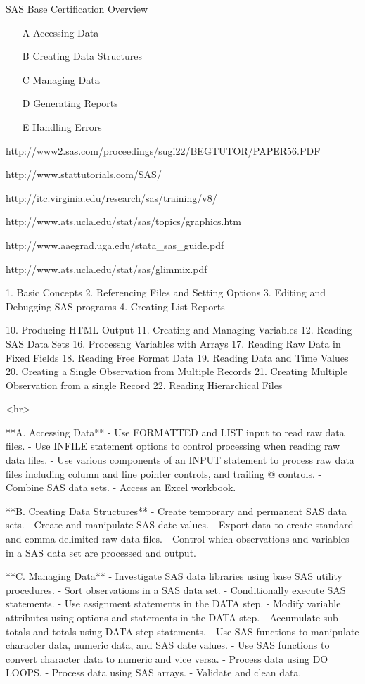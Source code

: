 
SAS Base Certification Overview

\begin{itemize}
\item[A] Accessing Data
\item[B] Creating Data Structures
\item[C] Managing Data
\item[D] Generating Reports
\item[E] Handling Errors
\end{itemize}

http://www2.sas.com/proceedings/sugi22/BEGTUTOR/PAPER56.PDF

http://www.stattutorials.com/SAS/

http://itc.virginia.edu/research/sas/training/v8/

http://www.ats.ucla.edu/stat/sas/topics/graphics.htm

http://www.aaegrad.uga.edu/stata_sas_guide.pdf

http://www.ats.ucla.edu/stat/sas/glimmix.pdf



1. Basic Concepts
2. Referencing Files and Setting Options
3. Editing and Debugging SAS programs
4. Creating List Reports

10. Producing HTML Output
11. Creating and Managing Variables
12. Reading SAS Data Sets
16. Processng Variables with Arrays
17. Reading Raw Data in Fixed Fields
18. Reading Free Format Data
19. Reading Data and Time Values
20. Creating a Single Observation from Multiple Records
21. Creating Multiple Observation from a single Record
22. Reading Hierarchical Files

<hr>

**A. Accessing Data**
- Use FORMATTED and LIST input to read raw data files.
- Use INFILE statement options to control processing when reading raw data files.
- Use various components of an INPUT statement to process raw data files including column and line pointer controls, and trailing @ controls.
- Combine SAS data sets.
- Access an Excel workbook.

**B. Creating Data Structures**
- Create temporary and permanent SAS data sets.
- Create and manipulate SAS date values.
- Export data to create standard and comma-delimited raw data files.
- Control which observations and variables in a SAS data set are processed and output.

**C. Managing Data**
- Investigate SAS data libraries using base SAS utility procedures.
- Sort observations in a SAS data set.
- Conditionally execute SAS statements.
- Use assignment statements in the DATA step.
- Modify variable attributes using options and statements in the DATA step.
- Accumulate sub-totals and totals using DATA step statements.
- Use SAS functions to manipulate character data, numeric data, and SAS date values.
- Use SAS functions to convert character data to numeric and vice versa.
- Process data using DO LOOPS.
- Process data using SAS arrays.
- Validate and clean data.

